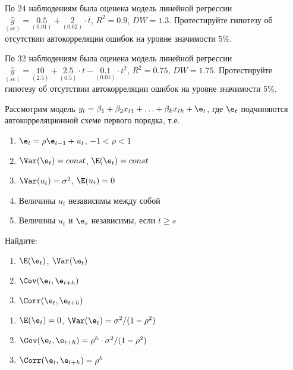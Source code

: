 \begin{solution}
\end{solution}



\begin{problem}
По 24 наблюдениям была оценена модель линейной регрессии
$\underset{(se)}{\hat{y}}=\underset{(0.01)}{0.5}+\underset{(0.02)}{2}\cdot t$, $R^2=0.9$, $DW=1.3$. Протестируйте гипотезу об отсутствии автокорреляции ошибок на уровне значимости 5\%.
\end{problem}

\begin{solution}
\end{solution}


\begin{problem}
По 32 наблюдениям была оценена модель линейной регрессии
$\underset{(se)}{\hat{y}}=\underset{(2.5)}{10}+\underset{(0.5)}{2.5}\cdot t- \underset{(0.01)}{0.1}\cdot t^2$, $R^2=0.75$, $DW=1.75$. Протестируйте гипотезу об отсутствии автокорреляции ошибок на уровне значимости 5\%.
\end{problem}

\begin{solution}
\end{solution}


\begin{problem}
Рассмотрим модель $y_t=\beta_1+\beta_2 x_{t1}+\ldots+\beta_k x_{tk}+\e_t$, где $\e_t$ подчиняются автокорреляционной схеме первого порядка, т.е.
\begin{enumerate}
\item $\e_t=\rho \e_{t-1}+u_t$, $-1<\rho<1$
\item $\Var(\e_t)=const$, $\E(\e_t)=const$
\item $\Var(u_t)=\sigma^2$, $\E(u_t)=0$
\item Величины $u_t$ независимы между собой
\item Величины $u_t$ и $\e_s$ независимы, если $t\geq s$
\end{enumerate}
Найдите:
\begin{enumerate}
\item $\E(\e_t)$, $\Var(\e_t)$
\item $\Cov(\e_t,\e_{t+h})$
\item $\Corr(\e_t,\e_{t+h})$
\end{enumerate}
\end{problem}

\begin{solution}
\begin{enumerate}
\item $\E(\e_t)=0$, $\Var(\e_t)=\sigma^2/(1-\rho^2)$
\item $\Cov(\e_t,\e_{t+h})=\rho^h\cdot \sigma^2/(1-\rho^2)$
\item $\Corr(\e_t,\e_{t+h})=\rho^h$
\end{enumerate}
\end{solution}



